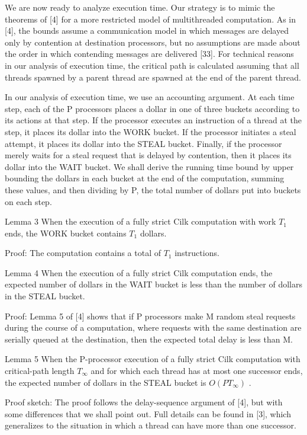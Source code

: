 \documentclass[
]{article}
\begin{document}
We are now ready to analyze execution time. Our strategy is to mimic the
theorems of {[}4{]} for a more restricted model of multithreaded
computation. As in {[}4{]}, the bounds assume a communication model in
which messages are delayed only by contention at destination processors,
but no assumptions are made about the order in which contending messages
are delivered {[}33{]}. For technical reasons in our analysis of
execution time, the critical path is calculated assuming that all
threads spawned by a parent thread are spawned at the end of the parent
thread.

In our analysis of execution time, we use an accounting argument. At
each time step, each of the P processors places a dollar in one of three
buckets according to its actions at that step. If the processor executes
an instruction of a thread at the step, it places its dollar into the
WORK bucket. If the processor initiates a steal attempt, it places its
dollar into the STEAL bucket. Finally, if the processor merely waits for
a steal request that is delayed by contention, then it places its dollar
into the WAIT bucket. We shall derive the running time bound by upper
bounding the dollars in each bucket at the end of the computation,
summing these values, and then dividing by P, the total number of
dollars put into buckets on each step.

Lemma 3 When the execution of a fully strict Cilk computation with work
\(T_{1}\) ends, the WORK bucket contains \(T_{1}\) dollars.

Proof: The computation contains a total of \(T_{1}\) instructions.

Lemma 4 When the execution of a fully strict Cilk computation ends, the
expected number of dollars in the WAIT bucket is less than the number of
dollars in the STEAL bucket.

Proof: Lemma 5 of {[}4{]} shows that if P processors make M random steal
requests during the course of a computation, where requests with the
same destination are serially queued at the destination, then the
expected total delay is less than M.

Lemma 5 When the P-processor execution of a fully strict Cilk
computation with critical-path length \(T_{\infty}\) and for which each
thread has at most one successor ends, the expected number of dollars in
the STEAL bucket is \(O(PT_{\infty})\) .

Proof sketch: The proof follows the delay-sequence argument of {[}4{]},
but with some differences that we shall point out. Full details can be
found in {[}3{]}, which generalizes to the situation in which a thread
can have more than one successor.
\end{document}
